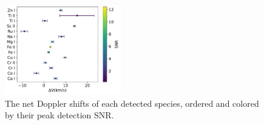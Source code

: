 \documentclass[twocolumn]{aastex631}
\begin{document}
        \begin{figure}
            \centering

        \end{figure}
            
        
        \begin{figure}[]\label{fig:combined-line-profiles-appendix} 
            \includegraphics[width=0.45\textwidth]{plots-updated/KELT-20b.inverted-transmission-better.CombinedRVs.pdf}
            \caption{The net Doppler shifts of each detected species, ordered and colored by their peak detection SNR.}
            
        \end{figure}
{}
       
    \clearpage
\end{document}
